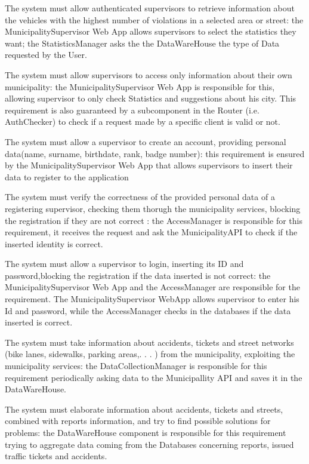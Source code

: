 \documentclass[a4paper]{report}
\begin{document}
\begin{enumerate}[start=1,label={[R\arabic*]}]
\item The system must allow authenticated supervisors to retrieve information about the vehicles with the highest number of violations in a selected area or street: the MunicipalitySupervisor Web App allows supervisors to select the statistics they want; the StatisticsManager asks the the DataWareHouse the type of Data requested by the User.
\item The system must allow supervisors to access only information about their own municipality: the MunicipalitySupervisor Web App  is responsible for this, allowing supervisor to only check Statistics and suggestions about his city. This requirement is also guaranteed by a subcomponent in the Router (i.e. AuthChecker) to check if a request made by a specific client is valid or not.
\item The system must allow a supervisor to create an account, providing personal data(name, surname, birthdate, rank,     badge number): this requirement is ensured by  the MunicipalitySupervisor Web App that allows supervisors to insert their data to register to the application
\item The system must verify the correctness of the provided personal data of a registering supervisor, checking them thorugh the municipality services, blocking the registration if they are not correct : the AccessManager is responsible for this requirement, it receives the request and ask the MunicipalityAPI to check if the inserted identity is correct.
\item The system must allow a supervisor to login, inserting its ID and password,blocking the registration if the data inserted is not correct: the MunicipalitySupervisor Web App and the AccessManager are responsible for the requirement. The MunicipalitySupervisor WebApp allows supervisor to enter his Id and password, while the AccessManager checks in the databases if the data inserted is correct.
\item The system must take information about accidents, tickets and street networks (bike lanes, sidewalks, parking areas,. . . ) from the municipality, exploiting the municipality services: the DataCollectionManager is responsible for this requirement periodically asking data to the Municipallity API and saves it in the DataWareHouse.
\item The system must elaborate information about accidents, tickets and streets, combined with reports information, and try to find possible solutions for problems: the DataWareHouse component is responsible for this requirement trying to aggregate data coming from the Databases concerning reports, issued traffic tickets and accidents.

\end{enumerate}
\end{document}
